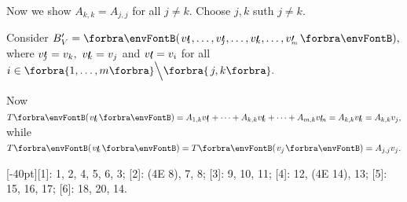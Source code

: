 Now we show $A_{k,k}=A_{j,j}$ for all $j\neq k.$ Choose $j,k$ suth $j\neq k.$\vspace{1pt}\par\quad
Consider $B_V'=\Par{v\apostrophe{\hspace{-3pt}_1},\dots,v\apostrophe{\hspace{-3pt}_j},\dots,v\apostrophe{\hspace{-3pt}_k},\dots,v\apostrophe_{\hspace{-3pt}_m}},$ where $v\prime{\hspace{-3pt}_j}=v_k,\,\,v\prime{\hspace{-3pt}_k}=v_j$ and $v\prime{\hspace{-3pt}_i}=v_i$ for all $i\in\Bra{1,\dots,m}\Backslash[\Big]\Bra{\,j,k}.$\vspace{1pt}\par\quad
Now $T\Par{v\apostrophe{\hspace{-3pt}_k}}=A_{1,k}v\apostrophe{\hspace{-3pt}_1}+\dots+A_{k,k}v\apostrophe{\hspace{-3pt}_k}+\dots+A_{m,k}v\apostrophe{\hspace{-3pt}_m}=A_{k,k}v\apostrophe{\hspace{-3pt}_k}=A_{k,k}v_j,$ while $T\Par{v\apostrophe{\hspace{-3pt}_k}}=T\Par{v_j}=A_{j,j}v_j.$\PfEnd
\SepLine
\ChEnd\pagebreak

[-40pt]{[1]: 1, 2, 4, 5, 6, 3; [2]: (4E 8), 7, 8; [3]: 9, 10, 11; [4]: 12, (4E 14), 13; [5]: 15, 16, 17; [6]: 18, 20, 14.}
\vspace{6pt}

\SepLine

